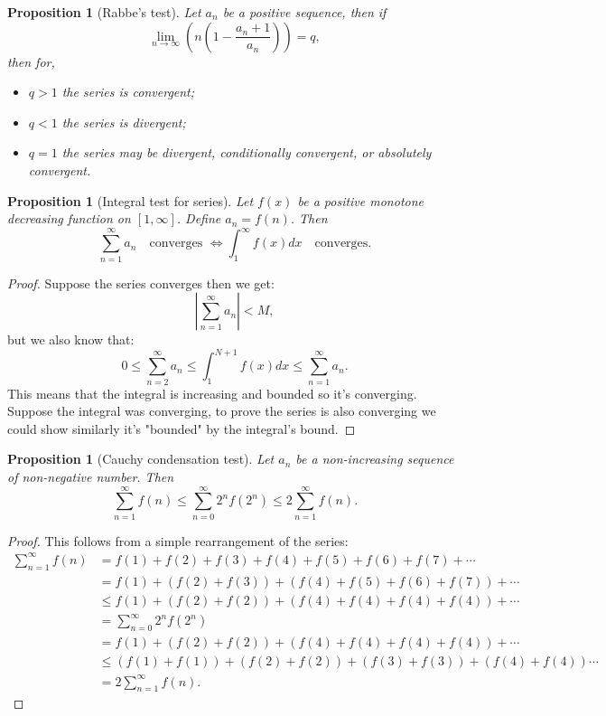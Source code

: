 \documentclass[11pt,a4paper]{article}
\theoremstyle{definition}
\theoremstyle{plain}
\newtheorem{proposition}[theorem]{Proposition}
\newcommand{\abs}[1]{\left\lvert #1\right\rvert}
\begin{document}
  \begin{proposition}[Rabbe's test]
    Let $a_n$ be a positive sequence, then if
    \[
      \lim_{n\to\infty} \left(n\left(1-\frac{a_n+1}{a_n}\right)\right) = q,
    \]
    then for,
    \begin{itemize}
      \item $q > 1$ the series is convergent;
      \item $q < 1$ the series is divergent;
      \item $q = 1$ the series may be divergent, conditionally convergent,
        or absolutely convergent.
    \end{itemize}
  \end{proposition}
	
	\newpage
	
  \begin{proposition}[Integral test for series]
    Let $f(x)$ be a positive monotone decreasing function on $[1,\infty]$. 
    Define $a_n = f(n)$. Then
    \[
      \sum_{n=1}^{\infty}{a_n} \quad \text{converges } \iff 
      \int_{1}^{\infty}{f(x)dx} \quad\text{converges}.
    \]
  \end{proposition}
  \begin{proof}
    Suppose the series converges then we get:
    \[
      \abs{\sum_{n=1}^{\infty} a_n} < M,
    \]
    but we also know that:
    \[
      0 \le
      \sum_{n=2}^{\infty} a_n \le 
      \int_{1}^{N+1} f(x)dx \le
      \sum_{n=1}^{\infty} a_n.
    \]
    This means that the integral is increasing and bounded so it's converging. 
    Suppose the integral was converging, to prove the series is also converging 
    we could show similarly it's "bounded" by the integral's bound.
  \end{proof}
	
	\newpage
	
  \begin{proposition}[Cauchy condensation test]
    Let $a_n$ be a non-increasing sequence of non-negative number.
    Then
    \[
       \sum_{n=1}^\infty {f(n)} \le 
       \sum_{n=0}^\infty {2^n f(2^n)} \le
      2\sum_{n=1}^\infty {f(n)}.
    \]
  \end{proposition}
  \begin{proof}
    This follows from a simple rearrangement of the series:
    \begin{align*}
      \sum_{n=1}^\infty{f(n)} 
      & = f(1) +  f(2) + f(3)  +  f(4) + f(5) + f(6) + f(7)  +\cdots \\
      & = f(1) + (f(2) + f(3)) + (f(4) + f(5) + f(6) + f(7)) +\cdots \\
       &\le f(1) + (f(2) + f(2)) + (f(4) + f(4) + f(4) + f(4)) +\cdots  \\
      & =  \sum_{n=0}^\infty{2^nf(2^n)} \\
      & = f(1) + (f(2) + f(2)) + (f(4) + f(4) + f(4) + f(4)) +\cdots \\
      & \le  (f(1)+f(1))+(f(2)+f(2))+(f(3)+f(3))+(f(4)+f(4)) \cdots \\
      & = 2\sum_{n=1}^\infty {f(n)}.
    \end{align*}
  \end{proof}
	
\end{document}
